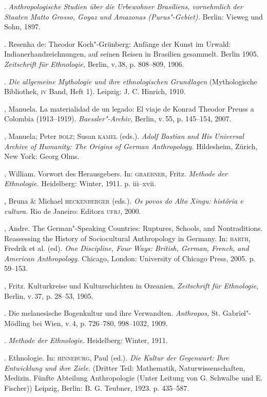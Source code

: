 \begin{bibliohedra}
\titidem. \textit{Anthropologische Studien über die
Urbewohner Brasiliens, vornehmlich der Staaten Matto Grosso, Goyaz und
Amazonas (Purus"-Gebiet).} Berlin: Vieweg und Sohn, 1897.

\titidem. Resenha de: Theodor Koch"-Grünberg: Anfänge der
Kunst im Urwald: Indianerhandzeichnungen, auf seinen Reisen in Brasilien
gesammelt. Berlin 1905. \textit{Zeitschrift für Ethnologie,} Berlin, v.\,38, p. 808--809, 1906.

\titidem. \textit{Die allgemeine Mythologie und ihre
ethnologischen Grundlagen} (Mythologische Bibliothek, \textsc{iv} Band, Heft
1)\emph{.} Leipzig: J. C. Hinrich, 1910.

, Manuela. La materialidad de un legado: El viaje de Konrad
Theodor Preuss a Colombia (1913--1919). \textit{Baessler"-Archiv,} Berlin,
v.\,55, p. 145--154, 2007.

, Manuela; Peter \textsc{bolz}; Susan \textsc{kamel} (eds.). \textit{Adolf Bastian
and His Universal Archive of Humanity: The Origins of German
Anthropology.} Hildesheim, Zürich, New York: Georg Olms.

, William. Vorwort des Herausgebers. In: \textsc{graebner}, Fritz.
\emph{Methode der Ethnologie.} Heidelberg: Winter, 1911. p. iii--xvii.

, Bruna \& Michael \textsc{heckenberger} (eds.). \textit{Os povos do
Alto Xingu: história e cultura.} Rio de Janeiro: Editora \textsc{ufrj}, 2000.

, Andre. The German"-Speaking Countries: Ruptures, Schools, and
Nontraditions. Reassessing the History of Sociocultural Anthropology in
Germany. In: \textsc{barth}, Fredrik et al. (ed). \textit{One Discipline, Four
Ways: British, German, French, and American Anthropology.} Chicago,
London: University of Chicago Press, 2005. p. 59--153.

, Fritz. Kulturkreise und Kulturschichten in Ozeanien.
\textit{Zeitschrift für Ethnologie,} Berlin, v.\,37, p. 28--53, 1905.

\titidem. Die melanesische Bogenkultur und ihre Verwandten.
\textit{Anthropos,} St. Gabriel"-Mödling bei Wien, v.\,4, p. 726--780,
998--1032, 1909.

\titidem. \textit{Methode der Ethnologie.} Heidelberg:
Winter, 1911.

\titidem. Ethnologie. In: \textsc{hinneburg}, Paul (ed.). \textit{Die
Kultur der Gegenwart: Ihre Entwicklung und ihre Ziele.} (Dritter Teil:
Mathematik, Naturwissenschaften, Medizin. Fünfte Abteilung
Anthropologie (Unter Leitung von G. Schwalbe und E. Fischer)) Leipzig,
Berlin: B. G. Teubner, 1923. p. 435--587.


\end{bibliohedra}
